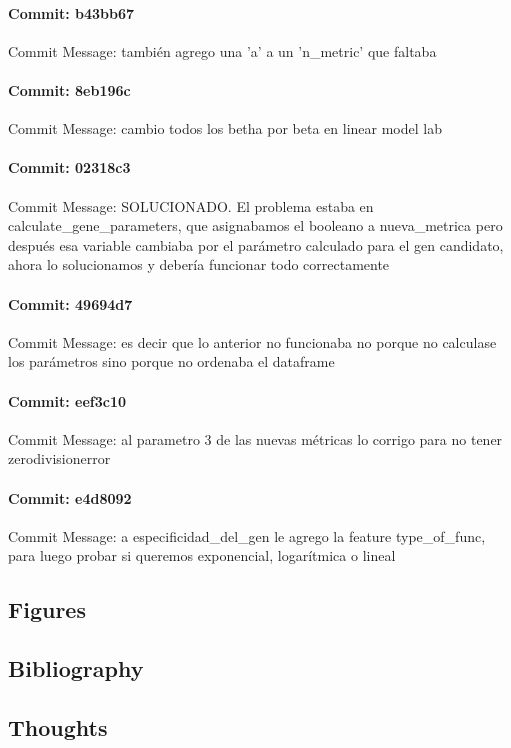 \documentclass{article}
\begin{document}
\paragraph{Commit: b43bb67}
Commit Message: también agrego una 'a' a un 'n_metric' que faltaba

\paragraph{Commit: 8eb196c}
Commit Message: cambio todos los betha por beta en linear model lab

\paragraph{Commit: 02318c3}
Commit Message: SOLUCIONADO. El problema estaba en calculate_gene_parameters, que asignabamos el booleano a nueva_metrica pero después esa variable cambiaba por el parámetro calculado para el gen candidato, ahora lo solucionamos y debería funcionar todo correctamente

\paragraph{Commit: 49694d7}
Commit Message: es decir que lo anterior no funcionaba no porque no calculase los parámetros sino porque no ordenaba el dataframe

\paragraph{Commit: eef3c10}
Commit Message: al parametro 3 de las nuevas métricas lo corrigo para no tener zerodivisionerror

\paragraph{Commit: e4d8092}
Commit Message: a especificidad_del_gen le agrego la feature type_of_func, para luego probar si queremos exponencial, logarítmica o lineal

\subsection{Figures}
\subsection{Bibliography}
\subsection{Thoughts}
\end{document}
